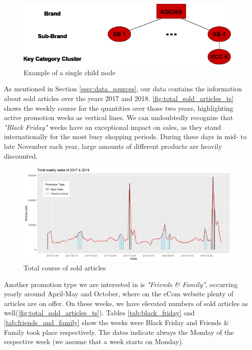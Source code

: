 \begin{figure}[H]
\centering
  \includegraphics[width=.7\linewidth]{figures/article_tree_single_childnode.eps}
  \caption{Example of a single child node}
  \label{fig:single_childnode}
\end{figure} 

As mentioned in Section \autoref{ssec:data_sources}, our data contains the information about sold articles over the years 2017 and 2018. \autoref{fig:total_sold_articles_ts} shows the weekly course for the quantities over those two years, highlighting active promotion weeks as vertical lines. We can undoubtedly recognize that \textit{"Black Friday"} weeks have an exceptional impact on sales, as they stand internationally for the most busy shopping periods. During these days in mid- to late November each year, large amounts of different products are heavily discounted.

\begin{figure}[H]
\centering
  \includegraphics[width=1\linewidth]{figures/total_sold_articles_ts.eps}
  \caption{Total course of sold articles}
  \label{fig:total_sold_articles_ts}
\end{figure}

Another promotion type we are interested in is \textit{"Friends \& Family"}, occurring yearly around April-May and October, where on the eCom website plenty of articles are on offer. On these weeks, we have elevated numbers of sold articles as well(\autoref{fig:total_sold_articles_ts}). Tables \ref{tab:black_friday} and \ref{tab:friends_and_family} show the weeks were Black Friday and Friends \& Family took place respectively. The dates indicate always the Monday of the respective week (we assume that a week starts on Monday).


